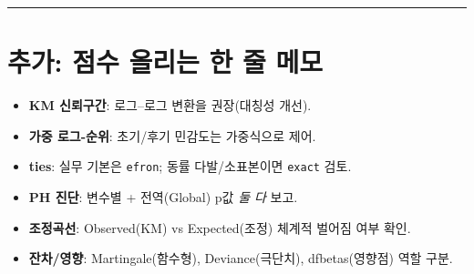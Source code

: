 \documentclass[12pt]{article}
\theoremstyle{myplain}
\begin{document}
\bigskip
\hrule
\bigskip

\section*{추가: 점수 올리는 한 줄 메모}
\begin{itemize}[leftmargin=*]
\item \textbf{KM 신뢰구간}: 로그--로그 변환을 권장(대칭성 개선).
\item \textbf{가중 로그-순위}: 초기/후기 민감도는 가중식으로 제어.
\item \textbf{ties}: 실무 기본은 \texttt{efron}; 동률 다발/소표본이면 \texttt{exact} 검토.
\item \textbf{PH 진단}: 변수별 + 전역(Global) p값 \emph{둘 다} 보고.
\item \textbf{조정곡선}: Observed(KM) vs Expected(조정) 체계적 벌어짐 여부 확인.
\item \textbf{잔차/영향}: Martingale(함수형), Deviance(극단치), dfbetas(영향점) 역할 구분.
\end{itemize}
\end{document}
